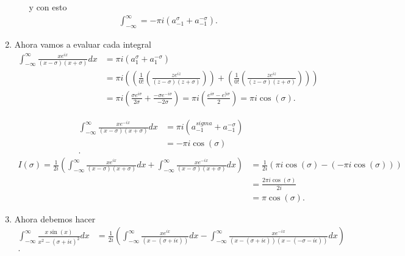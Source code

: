 \documentclass{report}
\begin{document}
\begin{enumerate}
\begin{enumerate}
	  y con esto
	  \begin{align*}
	    \int_{-\infty}^{\infty}=-\pi i \left( a_{-1}^{\sigma} + a_{-1}^{-\sigma} \right) 
	  .\end{align*}
      \end{enumerate}
    \item Ahora vamos a evaluar cada integral
      \begin{align*}
        \int_{-\infty}^{\infty}\frac{xe^{ix}}{\left( x-\sigma \right) \left( x+\sigma \right) }dx &= \pi i \left( a^{\sigma}_{1}+a^{-\sigma}_{1} \right)  \\
	&= \pi i \left( \left( \frac{1}{0!}\left( \frac{ze^{iz}}{\left( z-\sigma \right) \left( z+\sigma \right) } \right)  \right) + \left( \frac{1}{0!}\left( \frac{ze^{iz}}{\left( z-\sigma \right) \left( z+\sigma \right) } \right)  \right)  \right)  \\
	&= \pi i \left( \frac{\sigma e^{i\sigma}}{2\sigma}+\frac{-\sigma e^{-i\sigma}}{-2\sigma} \right) = \pi i \left( \frac{e^{i\sigma} - e^{[i\sigma}}{2} \right) = \pi i \cos\left( \sigma \right) 
      .\end{align*}

      \begin{align*}
        \int_{-\infty}^{\infty}\frac{xe^{-ix}}{\left( x-\sigma \right) \left( x+\sigma \right) }dx &= \pi i \left( a^{sigma}_{-1}+a^{-\sigma}_{-1} \right)  \\
	&= - \pi i \cos\left( \sigma \right)  \\
      .\end{align*}
      \begin{align*}
        I\left( \sigma \right) = \frac{1}{2i}\left( \int_{-\infty}^{\infty}\frac{xe^{ix}}{\left( x-\sigma \right) \left( x+\sigma \right) }dx + \int_{-\infty}^{\infty}\frac{xe^{-ix}}{\left( x-\sigma \right) \left( x+\sigma \right) }dx\right) &= \frac{1}{2i}\left( \pi i\cos\left( \sigma \right) - \left( - \pi i \cos\left( \sigma \right)  \right)  \right)  \\
	&= \frac{2\pi i \cos\left( \sigma \right) }{2i} \\
	&= \pi \cos\left( \sigma \right) 
      .\end{align*}
    \item Ahora debemos hacer
      \begin{align*}
        \int_{-\infty}^{\infty}\frac{x\sin\left( x \right) }{x^2-\left( \sigma+i\epsilon \right)^2} dx &= \frac{1}{2i}\left( \int_{-\infty}^{\infty}\frac{xe^{ix}}{\left( x-\left( \sigma + i\epsilon \right)  \right) } dx - \int_{-\infty}^{\infty}\frac{xe^{-ix}}{\left( x-\left( \sigma+i\epsilon \right)  \right) \left( x-\left( -\sigma-i\epsilon \right)  \right) } dx \right) \\
      .\end{align*}


\end{enumerate}
\end{document}
